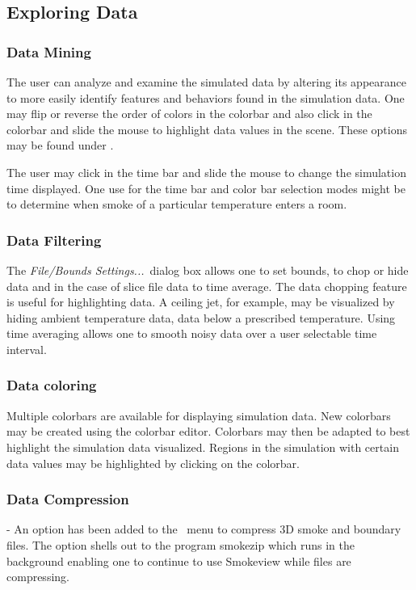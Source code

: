 \documentclass[11pt,twoside]{book}
\newcommand{\frameit}[1]{\fbox{\tt #1}}
\begin{document}
\subsection{Exploring Data}

\subsubsection{Data Mining} The user can analyze and examine the simulated
data by altering its appearance to more easily identify features
and behaviors found in the simulation data. One may flip or
reverse the order of colors in the colorbar and also click in the
colorbar and slide the mouse to highlight data values in the
scene. These options may be found under \frameit{Options/Shades}.

The user may click in the time bar and slide the mouse to
change the simulation time displayed. One use for the time
bar and color bar selection modes might be to determine
when smoke of a particular temperature enters a room.

\subsubsection{Data Filtering} The {\em File/Bounds Settings...}\
dialog box allows one to set bounds, to chop or hide data and in the case
of slice file data to time average. The data chopping
feature is useful for highlighting data.  A ceiling jet, for example,
may be visualized by hiding ambient temperature
data,  data below a prescribed temperature.
Using time averaging allows one to smooth noisy data over a user selectable time
interval.

\subsubsection{Data coloring} Multiple colorbars are available for displaying simulation data.
New colorbars may be created using the colorbar editor.  Colorbars may then be adapted to best highlight the simulation data visualized.
Regions in the simulation with certain data values may be highlighted by clicking on the colorbar.

\subsubsection{Data Compression} - An option has been added to the
\fbox{LOAD/UNLOAD}\ menu to compress 3D smoke and boundary
files. The option shells out to the program smokezip which runs in
the background enabling one to continue to use Smokeview while
files are compressing.
\end{document}

